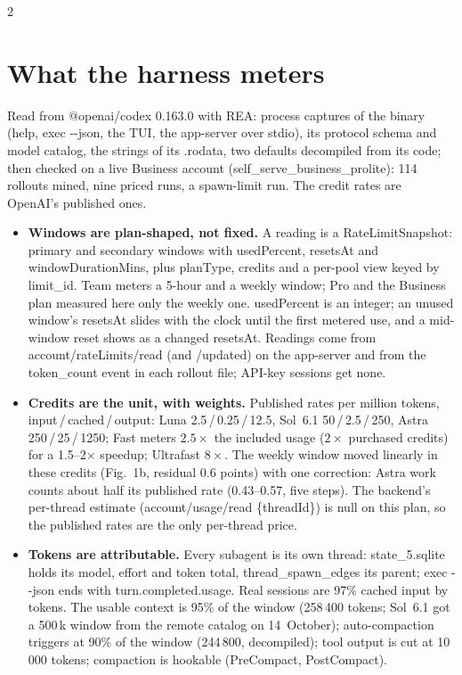 \documentclass[9pt,a4paper]{extarticle}
\newcommand{\para}[1]{\textsf{\textbf{#1}}\enspace}
\begin{document}
\begin{multicols}{2}
\fontsize{8.0}{9.45}\selectfont

\section{What the harness meters}
Read from \textsf{@openai/codex} 0.163.0 with REA: process captures of the binary (help, \textsf{exec -{}-json}, the TUI, the app-server over stdio), its protocol schema and model catalog, the strings of its \textsf{.rodata}, two defaults decompiled from its code; then checked on a live Business account (\textsf{self\_serve\_business\_prolite}): 114 rollouts mined, nine priced runs, a spawn-limit run. The credit rates are OpenAI's published ones.
\begin{itemize}
\item \para{Windows are plan-shaped, not fixed.} A reading is a \textsf{RateLimitSnapshot}: \textsf{primary} and \textsf{secondary} windows with \textsf{usedPercent}, \textsf{resetsAt} and \textsf{windowDurationMins}, plus \textsf{planType}, \textsf{credits} and a per-pool view keyed by \textsf{limit\_id}. Team meters a 5-hour and a weekly window; Pro and the Business plan measured here only the weekly one. \textsf{usedPercent} is an integer; an unused window's \textsf{resetsAt} slides with the clock until the first metered use, and a mid-window reset shows as a changed \textsf{resetsAt}. Readings come from \textsf{account/rateLimits/read} (and \textsf{/updated}) on the app-server and from the \textsf{token\_count} event in each rollout file; API-key sessions get none.
\item \para{Credits are the unit, with weights.} Published rates per million tokens, input\,/\,cached\,/\,output: Luna 2.5\,/\,0.25\,/\,12.5, Sol~6.1 50\,/\,2.5\,/\,250, Astra 250\,/\,25\,/\,1250; Fast meters $2.5\times$ the included usage ($2\times$ purchased credits) for a 1.5--2$\times$ speedup; Ultrafast $8\times$. The weekly window moved linearly in these credits (Fig.~1b, residual 0.6 points) with one correction: Astra work counts about half its published rate (0.43--0.57, five steps). The backend's per-thread estimate (\textsf{account/usage/read \{threadId\}}) is \textsf{null} on this plan, so the published rates are the only per-thread price.
\item \para{Tokens are attributable.} Every subagent is its own thread: \textsf{state\_5.sqlite} holds its model, effort and token total, \textsf{thread\_spawn\_edges} its parent; \textsf{exec -{}-json} ends with \textsf{turn.completed.usage}. Real sessions are 97\% cached input by tokens. The usable context is 95\% of the window (258\,400 tokens; Sol~6.1 got a 500\,k window from the remote catalog on 14~October); auto-compaction triggers at 90\% of the window (244\,800, decompiled); tool output is cut at 10\,000 tokens; compaction is hookable (\textsf{PreCompact}, \textsf{PostCompact}).

\end{itemize}
\end{multicols}
\end{document}

